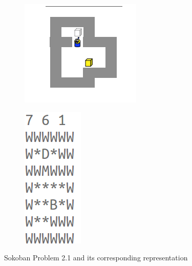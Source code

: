 \documentclass[10pt, letter]{article}
\begin{document}
\begin{figure} [h!]
\centering
\begin{subfigure}{.5\textwidth}
  \centering
  \includegraphics[scale = 0.5]{images/sokoban1}
\end{subfigure}%
\begin{subfigure}{.5\textwidth}
  \centering
  \includegraphics[scale = 0.5]{images/sokoban1-plan}
\end{subfigure}%
\caption{Sokoban Problem 2.1 and its corresponding representation}
\label{soko1}
\end{figure}
\end{document}
